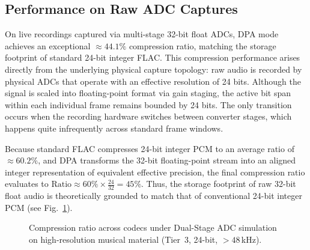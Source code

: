 \documentclass[10pt,twocolumn]{article}
\begin{document}
\subsection{Performance on Raw ADC Captures}
On live recordings captured via multi-stage 32-bit float ADCs, DPA mode achieves an exceptional $\approx 44.1\%$ compression ratio, matching the storage footprint of standard 24-bit integer FLAC. This compression performance arises directly from the underlying physical capture topology: raw audio is recorded by physical ADCs that operate with an effective resolution of 24 bits. Although the signal is scaled into floating-point format via gain staging, the active bit span within each individual frame remains bounded by 24 bits. The only transition occurs when the recording hardware switches between converter stages, which happens quite infrequently across standard frame windows.

Because standard FLAC compresses 24-bit integer PCM to an average ratio of $\approx 60.2\%$, and DPA transforms the 32-bit floating-point stream into an aligned integer representation of equivalent effective precision, the final compression ratio evaluates to $\text{Ratio} \approx 60\% \times \frac{24}{32} = 45\%$. Thus, the storage footprint of raw 32-bit float audio is theoretically grounded to match that of conventional 24-bit integer PCM (see Fig.~\ref{fig:chart_adc}).

\begin{figure}[!ht]
	\centering
	\caption{Compression ratio across codecs under Dual-Stage ADC simulation on high-resolution musical material (Tier~3, 24-bit, $>48$\,kHz).}
	\label{fig:chart_adc}
\end{figure}
\end{document}
